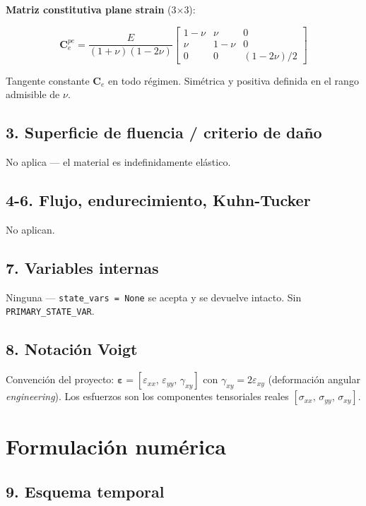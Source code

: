 \documentclass[11pt,letterpaper,oneside]{report}
\begin{document}
\textbf{Matriz constitutiva plane strain} (3\ensuremath{\times}3):

\[
\mathbf C^{pe}_e = \frac{E}{(1+\nu)(1-2\nu)}\begin{bmatrix} 1-\nu & \nu & 0 \\ \nu & 1-\nu & 0 \\ 0 & 0 & (1-2\nu)/2 \end{bmatrix}
\]

Tangente constante $\mathbf C_e$ en todo régimen. Simétrica y positiva definida en el rango admisible de $\nu$.

\subsection{3. Superficie de fluencia / criterio de daño}

No aplica --- el material es indefinidamente elástico.

\subsection{4-6. Flujo, endurecimiento, Kuhn-Tucker}

No aplican.

\subsection{7. Variables internas}

Ninguna --- \texttt{state\_vars = None} se acepta y se devuelve intacto. Sin \texttt{PRIMARY\_STATE\_VAR}.

\subsection{8. Notación Voigt}

Convención del proyecto: $\boldsymbol\varepsilon = [\varepsilon_{xx},\,\varepsilon_{yy},\,\gamma_{xy}]$ con $\gamma_{xy} = 2\varepsilon_{xy}$ (deformación angular \textit{engineering}). Los esfuerzos son los componentes tensoriales reales $[\sigma_{xx},\,\sigma_{yy},\,\sigma_{xy}]$.


\section{Formulación numérica}

\subsection{9. Esquema temporal}
\end{document}
